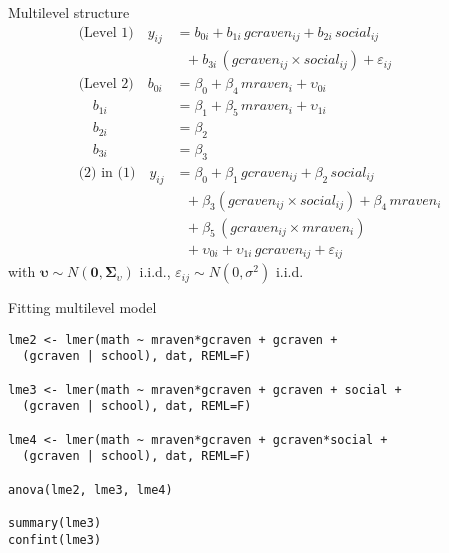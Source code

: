\documentclass{beamer}
\newcommand{\gvect}[1]{\boldsymbol{#1}}
\newcommand{\gmat}[1]{\boldsymbol{#1}}
\begin{document}
\begin{frame}{Multilevel structure}
\begin{align*}
\text{(Level 1)} \quad y_{ij} &= b_{0i} + b_{1i}\,gcraven_{ij} + b_{2i}\,social_{ij}\\
                            &~~~ + b_{3i}\,(gcraven_{ij}\times social_{ij}) + \varepsilon_{ij}\\
\text{(Level 2)} \quad b_{0i} &= \beta_0 + \beta_4\,mraven_i + \upsilon_{0i} \\
                 \quad b_{1i} &= \beta_1 + \beta_5\,mraven_i + \upsilon_{1i}\\
                 \quad b_{2i} &= \beta_2\\
                 \quad b_{3i} &= \beta_3\\
\text{(2) in (1)} \quad y_{ij} &= \beta_{0} + \beta_{1}\,gcraven_{ij} + \beta_{2}\,social_{ij}\\
                            &~~~ + \beta_{3}(gcraven_{ij}\times social_{ij}) + \beta_{4}\,mraven_i\\
                            &~~~ + \beta_{5}\,(gcraven_{ij} \times mraven_{i})\\
                            &~~~ + \upsilon_{0i} + \upsilon_{1i}\,gcraven_{ij} + \varepsilon_{ij}
\end{align*}
with $\gvect\upsilon \sim N(\gvect 0, \gmat{\Sigma}_\upsilon)$ i.i.d.,
$\varepsilon_{ij} \sim N(0, \sigma^2)$ i.i.d.
\end{frame}

{

\begin{frame}[fragile]{Fitting multilevel model}
  \begin{lstlisting}
lme2 <- lmer(math ~ mraven*gcraven + gcraven + 
  (gcraven | school), dat, REML=F)

lme3 <- lmer(math ~ mraven*gcraven + gcraven + social +
  (gcraven | school), dat, REML=F)

lme4 <- lmer(math ~ mraven*gcraven + gcraven*social + 
  (gcraven | school), dat, REML=F)

anova(lme2, lme3, lme4)

summary(lme3)
confint(lme3)
  \end{lstlisting}
\end{frame}

}
\end{document}
